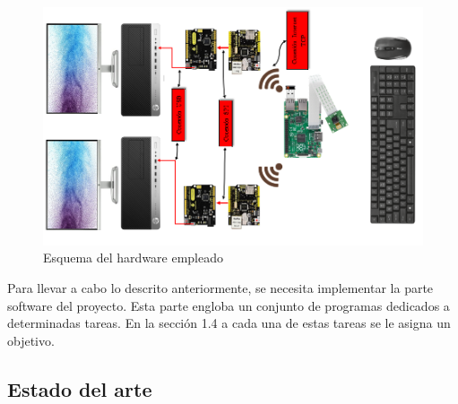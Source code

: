 \begin{figure}
\centering
\includegraphics[scale = 0.6, angle=-90]{capitulo_01/figuras_dir/esquemahardware.jpg}
\caption{Esquema del hardware empleado}
\label{fig:esquemahardware}
\end{figure}


Para llevar a cabo lo descrito anteriormente, se necesita implementar la parte software del proyecto. Esta parte engloba un conjunto de programas dedicados a determinadas tareas. En la sección 1.4 a cada una de estas tareas se le asigna un objetivo.

\subsection{Estado del arte} \label{s1_3_1}

